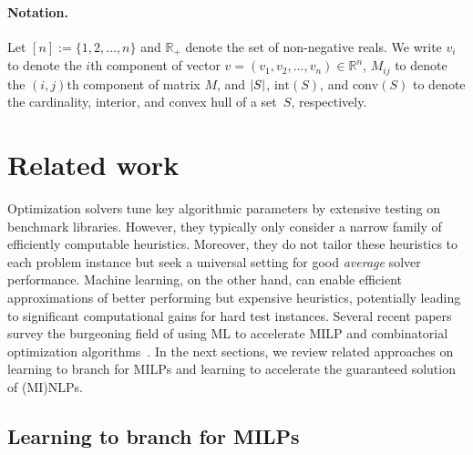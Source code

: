 \documentclass{article}
\DeclarePairedDelimiter\abs{\lvert}{\rvert}%
\begin{document}
\paragraph{Notation.}
Let $[n] := \{1,2,\dots,n\}$ and $\mathbb{R}_+$ denote the set of non-negative reals.
We write $v_i$ to denote the $i$th component of vector $v = (v_1,v_2,\dots,v_n) \in \mathbb{R}^n$, $M_{ij}$ to denote the $(i,j)$th component of matrix $M$, and $\abs{S}$, $\text{int}(S)$, and $\text{conv}(S)$ to denote the cardinality, interior, and convex hull of a set~$S$, respectively.



\section{Related work}
\label{sec:relatedwork}


Optimization solvers tune key algorithmic parameters by extensive testing on benchmark libraries.
However, they typically only consider a narrow family of efficiently computable heuristics.
Moreover, they do not tailor these heuristics to each problem instance but seek a universal setting for good \textit{average} solver performance.
Machine learning, on the other hand, can enable efficient approximations of better performing but expensive heuristics, potentially leading to significant computational gains for hard test instances.
Several recent papers survey the burgeoning field of using ML to accelerate MILP and combinatorial optimization algorithms~\cite{bengio2021machine,cappart2021combinatorial,kotary2021end,lodi2017learning}.
In the next sections, we review related approaches on learning to branch for MILPs and learning to accelerate the guaranteed solution of (MI)NLPs.






\subsection{Learning to branch for MILPs}
\end{document}
